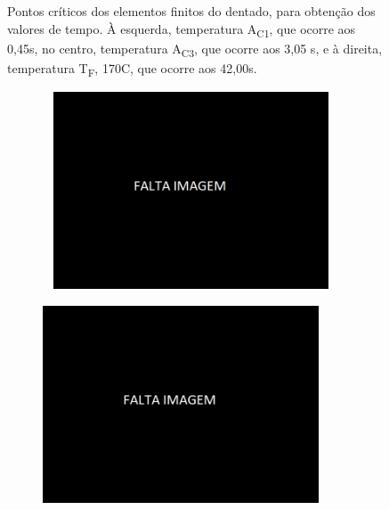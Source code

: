 \begin{figure}[htb]
\begin{subfigure}{.33\textwidth}
        \caption{}
        \label{fig:Tf_Dent}
    \end{subfigure}
    \caption[Pontos críticos dos elementos finitos do dentado]%
    {Pontos críticos dos elementos finitos do dentado, para obtenção dos valores de tempo. À esquerda, temperatura A\textsubscript{C1}, que ocorre aos 0,45s, no centro, temperatura A\textsubscript{C3}, que ocorre aos 3,05 s, e à direita, temperatura T\textsubscript{F}, 170\textdegree C, que ocorre aos 42,00s.}
    \label{fig:Dentado}
\end{figure}
\begin{figure}[htb]
    \centering
    \begin{subfigure}{.33\textwidth}\
        \centering
        \includegraphics[width = 0.9\textwidth]{Figures/Cap4/Falta_Imagem.png}
        \caption[]%
        {}
        \label{fig:A3_Dint}
    \end{subfigure}%
    \begin{subfigure}{.33\textwidth}
        \centering
        \includegraphics[width = 0.9\textwidth]{Figures/Cap4/Falta_Imagem.png}

\end{subfigure}
\end{figure}
